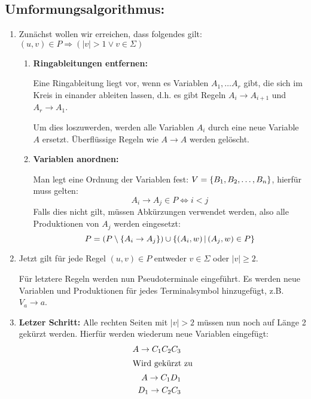 \subsection{Umformungsalgorithmus:}
\begin{enumerate}
	\item Zunächst wollen wir erreichen, dass folgendes gilt: $(u,v)\in P\Rightarrow (|v|>1 \vee v\in \Sigma)$
	\begin{enumerate}
		\item \textbf{Ringableitungen entfernen:}

		Eine Ringableitung liegt vor, wenn es Variablen $A_1,\ldots A_r$ gibt, die sich im Kreis in einander ableiten lassen, d.h. es gibt Regeln $A_i\rightarrow A_{i+1}$ und $A_r\rightarrow A_1$.

		Um dies loszuwerden, werden alle Variablen $A_i$ durch eine neue Variable $A$ ersetzt. Überflüssige Regeln wie $A\rightarrow A$ werden gelöscht.
		\item \textbf{Variablen anordnen:}

		Man legt eine Ordnung der Variablen fest: $V=\left\{ B_1, B_2, \ldots, B_n \right\}$, hierfür muss gelten:
		\begin{equation*}
			A_i\rightarrow A_j \in P \Leftrightarrow i<j
		\end{equation*}
		Falls dies nicht gilt, müssen Abkürzungen verwendet werden, also alle Produktionen von $A_j$ werden eingesetzt:
		\begin{equation*}
			P=(P\setminus\left\{ A_i\rightarrow A_j \right\})\cup\left\{ (A_i,w) \,\middle|\, (A_j,w)\in P \right\}
		\end{equation*}
	\end{enumerate}
	\item Jetzt gilt für jede Regel $(u,v)\in P$ entweder $v\in\Sigma$ oder $|v|\geq 2$.

	Für letztere Regeln werden nun Pseudoterminale eingeführt. Es werden neue Variablen und Produktionen für jedes Terminalsymbol hinzugefügt, z.B. $V_a\rightarrow a$.

	\item \textbf{Letzer Schritt:} Alle rechten Seiten mit $|v|>2$ müssen nun noch auf Länge 2 gekürzt werden. Hierfür werden wiederum neue Variablen eingefügt:%
	\begin{align*}
		A\rightarrow C_1C_2C_3\\
		\intertext{Wird gekürzt zu}
		A\rightarrow C_1D_1\\
		D_1\rightarrow C_2C_3
	\end{align*}
\end{enumerate}

